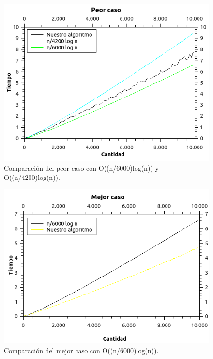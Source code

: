 \begin{figure}[H]
\begin{center}

  \includegraphics[width=\linewidth]{../graficos/ej2/Peor.png}
  \caption{{\small Comparación del peor caso con O((n/6000)log(n)) y O((n/4200)log(n)).}} \label{ej2-peor-caso}
\endminipage

\end{center}
\end{figure}


\begin{figure}[H]
\begin{center}

  \includegraphics[width=\linewidth]{../graficos/ej2/Mejor.png}
  \caption{{\small Comparación del mejor caso con O((n/6000)log(n)).}} \label{ej2-mejor-caso}
\endminipage

\end{center}
\end{figure}


